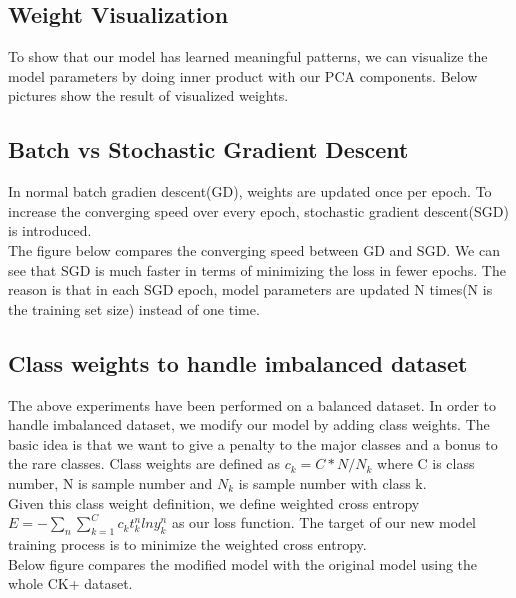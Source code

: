\documentclass{article} %
\begin{document}
\subsection {Weight Visualization}
To show that our model has learned meaningful patterns, we can visualize the model parameters by doing inner product with our PCA components. Below pictures show the result of visualized weights. 
\subsection {Batch vs Stochastic Gradient Descent}
In normal batch gradien descent(GD), weights are updated once per epoch. To increase the converging speed over every epoch, stochastic gradient descent(SGD) is introduced.\\
The figure below compares the converging speed between GD and SGD. We can see that SGD is much faster in terms of minimizing the loss in fewer epochs. The reason is that in each SGD epoch, model parameters are updated N times(N is the training set size) instead of one time.
\subsection {Class weights to handle imbalanced dataset}
The above experiments have been performed on a balanced dataset. In order to handle imbalanced dataset, we modify our model by adding class weights. The basic idea is that we want to give a penalty to the major classes and a bonus to the rare classes. Class weights are defined as $c_k = C*N/N_k$ where C is class number, N is sample number and $N_k$ is sample number with class k. \\
Given this class weight definition, we define weighted cross entropy $E = -\sum_{n}\sum_{k=1}^{C} c_k t_k^n ln y_k^n $ as our loss function. The target of our new model training process is to minimize the weighted cross entropy. \\
Below figure compares the modified model with the original model using the whole CK+ dataset.
\end{document}
